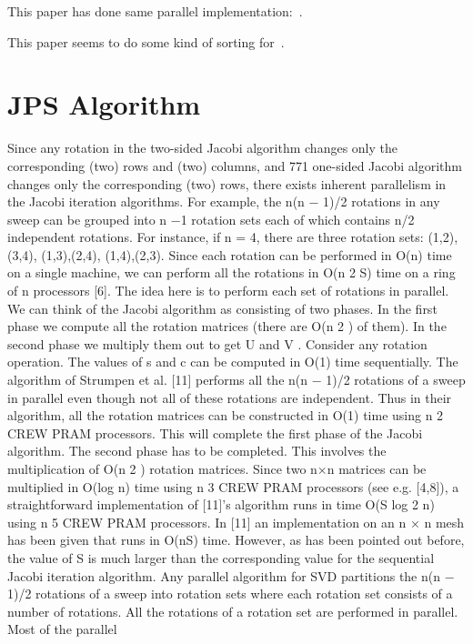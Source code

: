 \documentclass[10pt, conference, compsocconf]{IEEEtran}
\begin{document}
This paper has done same parallel implementation:~\cite{soliman2008memory}.

This paper seems to do some kind of sorting for~\cite{zhou1995parallel}.

\section{JPS Algorithm}
\label{sec:jps}

Since any rotation in the two-sided Jacobi algorithm changes
only the corresponding (two) rows and (two) columns, and
771
one-sided Jacobi algorithm changes only the corresponding
(two) rows, there exists inherent parallelism in the Jacobi
iteration algorithms. For example, the n(n − 1)/2 rotations in
any sweep can be grouped into n −1 rotation sets each of which
contains n/2 independent rotations. For instance, if n = 4, there
are three rotation sets: {(1,2),(3,4)}, {(1,3),(2,4)}, {(1,4),(2,3)}.
Since each rotation can be performed in O(n) time on a single
machine, we can perform all the rotations in O(n 2 S) time on a
ring of n processors [6]. The idea here is to perform each set of
rotations in parallel.
We can think of the Jacobi algorithm as consisting of two
phases. In the first phase we compute all the rotation matrices
(there are O(n 2 ) of them). In the second phase we multiply
them out to get U and V . Consider any rotation operation. The
values of s and c can be computed in O(1) time sequentially.
The algorithm of Strumpen et al. [11] performs all the n(n −
1)/2 rotations of a sweep in parallel even though not all of
these rotations are independent. Thus in their algorithm, all
the rotation matrices can be constructed in O(1) time using
n 2 CREW PRAM processors. This will complete the first
phase of the Jacobi algorithm. The second phase has to be
completed. This involves the multiplication of O(n 2 ) rotation
matrices. Since two n×n matrices can be multiplied in O(log n)
time using n 3 CREW PRAM processors (see e.g. [4,8]), a
straightforward implementation of [11]’s algorithm runs in time
O(S log 2 n) using n 5 CREW PRAM processors. In [11] an
implementation on an n × n mesh has been given that runs
in O(nS) time. However, as has been pointed out before, the
value of S is much larger than the corresponding value for the
sequential Jacobi iteration algorithm.
Any parallel algorithm for SVD partitions the n(n − 1)/2
rotations of a sweep into rotation sets where each rotation
set consists of a number of rotations. All the rotations of a
rotation set are performed in parallel. Most of the parallel
\end{document}
